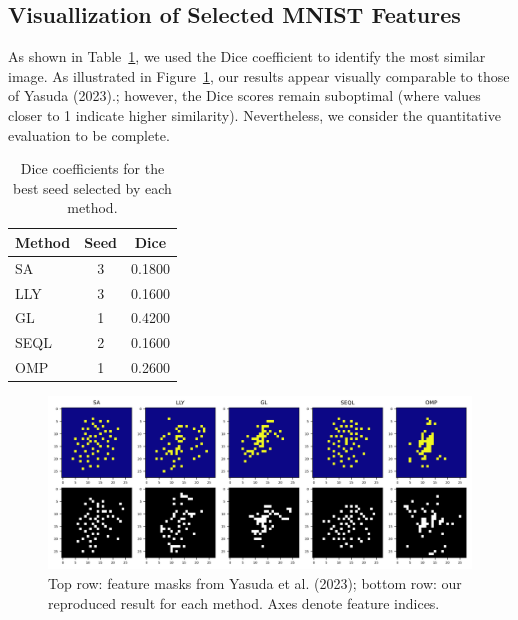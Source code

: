 \documentclass[a4paper,twocolumn]{article} %
\begin{document}
\subsection{Visuallization of Selected MNIST Features}

As shown in Table~\ref{tab:dice_results}, we used the Dice coefficient to identify the most similar image. As illustrated in Figure~\ref{fig:feature_masks}, our results appear visually comparable to those of Yasuda (2023).; however, the Dice scores remain suboptimal (where values closer to 1 indicate higher similarity). Nevertheless, we consider the quantitative evaluation to be complete.
\begin{table}[ht]
    \centering
    \caption{Dice coefficients for the best seed selected by each method.}
    \begin{tabular}{lcc}
        \hline
        \textbf{Method} & \textbf{Seed} & \textbf{Dice} \\
        \hline
        SA    & 3 & 0.1800 \\
        LLY   & 3 & 0.1600 \\
        GL    & 1 & 0.4200 \\
        SEQL  & 2 & 0.1600 \\
        OMP   & 1 & 0.2600 \\
        \hline
    \end{tabular}
    \label{tab:dice_results}
\end{table}
\begin{figure}[h!]
    \centering
    \includegraphics[width=\textwidth]{figures/all_methods_with_axis.png}
    \caption{Top row: feature masks from Yasuda et al. (2023); bottom row: our reproduced result for each method. Axes denote feature indices.}
    \label{fig:feature_masks}
\end{figure}
\end{document}
